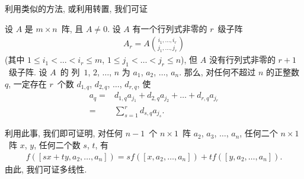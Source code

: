 利用类似的方法, 或利用转置, 我们可证

\begin{theorem}
    设 \(A\) 是 \(m \times n\)~阵,
    且 \(A \neq 0\).
    设 \(A\) 有一个行列式非零的 \(r\)~级子阵
    \begin{align*}
        A_r = A\binom{i_1,\dots,i_r}{j_1,\dots,j_r}
    \end{align*}
    (其中
    \(1 \leq i_1 < \dots < i_r \leq m\),
    \(1 \leq j_1 < \dots < j_r \leq n\)),
    但 \(A\) 没有行列式非零的 \(r+1\)~级子阵.
    设 \(A\)~的%
    列~\(1\), \(2\), \(\dots\), \(n\)
    为 \(a_1\), \(a_2\), \(\dots\), \(a_n\).
    那么, 对任何不超过 \(n\) 的正整数 \(q\),
    一定存在 \(r\)~个数
    \(d_{1,q}\), \(d_{2,q}\), \(\dots\), \(d_{r,q}\),
    使
    \begin{align*}
        a_q
        = {} &
        d_{1,q} a_{j_1}
        + d_{2,q} a_{j_2}
        + \dots
        + d_{r,q} a_{j_r}
        \\
        = {} &
        \sum_{s = 1}^{r} {d_{s,q} a_{j_s}}.
    \end{align*}
\end{theorem}

利用此事, 我们即可证明,
对任何 \(n-1\)~个 \(n \times 1\)~阵
\(a_2\), \(a_3\), \(\dots\), \(a_n\),
任何二个 \(n \times 1\)~阵 \(x\), \(y\),
任何二个数 \(s\), \(t\),
有
\begin{align*}
    f {([sx + ty, a_2, \dots, a_n])}
    =
    s
    f {([x, a_2, \dots, a_n])}
    +
    t
    f {([y, a_2, \dots, a_n])}.
\end{align*}
由此, 我们可证多线性.

